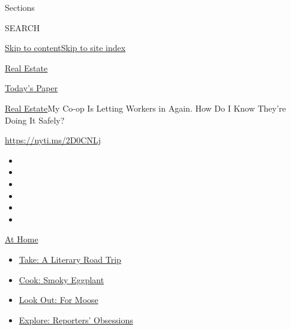 Sections

SEARCH

\protect\hyperlink{site-content}{Skip to
content}\protect\hyperlink{site-index}{Skip to site index}

\href{https://www.nytimes3xbfgragh.onion/section/realestate}{Real
Estate}

\href{https://myaccount.nytimes3xbfgragh.onion/auth/login?response_type=cookie\&client_id=vi}{}

\href{https://www.nytimes3xbfgragh.onion/section/todayspaper}{Today's
Paper}

\href{/section/realestate}{Real Estate}\textbar{}My Co-op Is Letting
Workers in Again. How Do I Know They're Doing It Safely?

\url{https://nyti.ms/2D0CNLj}

\begin{itemize}
\item
\item
\item
\item
\item
\item
\end{itemize}

\href{https://www.nytimes3xbfgragh.onion/spotlight/at-home?action=click\&pgtype=Article\&state=default\&region=TOP_BANNER\&context=at_home_menu}{At
Home}

\begin{itemize}
\tightlist
\item
  \href{https://www.nytimes3xbfgragh.onion/2020/07/28/books/time-for-a-literary-road-trip.html?action=click\&pgtype=Article\&state=default\&region=TOP_BANNER\&context=at_home_menu}{Take:
  A Literary Road Trip}
\item
  \href{https://www.nytimes3xbfgragh.onion/2020/07/29/magazine/bored-with-your-home-cooking-some-smoky-eggplant-will-fix-that.html?action=click\&pgtype=Article\&state=default\&region=TOP_BANNER\&context=at_home_menu}{Cook:
  Smoky Eggplant}
\item
  \href{https://www.nytimes3xbfgragh.onion/2020/07/27/travel/moose-michigan-isle-royale.html?action=click\&pgtype=Article\&state=default\&region=TOP_BANNER\&context=at_home_menu}{Look
  Out: For Moose}
\item
  \href{https://www.nytimes3xbfgragh.onion/interactive/2020/at-home/even-more-reporters-editors-diaries-lists-recommendations.html?action=click\&pgtype=Article\&state=default\&region=TOP_BANNER\&context=at_home_menu}{Explore:
  Reporters' Obsessions}
\end{itemize}

